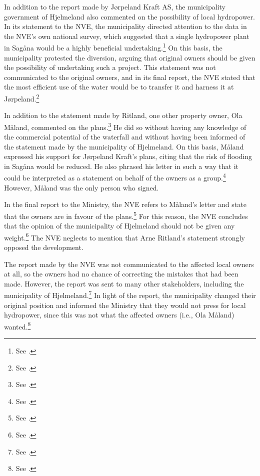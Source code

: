 In addition to the report made by Jørpeland Kraft AS, the municipality government of Hjelmeland also commented on the possibility of local hydropower. In its statement to the NVE, the municipality directed attention to the data in the NVE's own national survey, which suggested that a single hydropower plant in Sagåna would be a highly beneficial undertaking.\footnote{See \cite[19]{jorpeland09}.} On this basis, the municipality protested the diversion, arguing that original owners should be given the possibility of undertaking such a project. This statement was not communicated to the original owners, and in its final report, the NVE stated that the most efficient use of the water would be to transfer it and harness it at Jørpeland.\footnote{See \cite[19]{jorpeland09}.}

In addition to the statement made by Ritland, one other property owner, Ola Måland, commented on the plans.\footnote{See \cite[17]{jorpeland09}.} He did so without having any knowledge of the commercial potential of the waterfall and without having been informed of the statement made by the municipality of Hjelmeland. On this basis, Måland expressed his support for Jørpeland Kraft's plans, citing that the risk of flooding in Sagåna would be reduced. He also phrased his letter in such a way that it could be interpreted as a statement on behalf of the owners as a group.\footnote{See \cite[17]{jorpeland09}.} However, Måland was the only person who signed.

In the final report to the Ministry, the NVE refers to Måland's letter and state that the owners are in favour of the plans.\footnote{See \cite[19]{jorpeland09}.} For this reason, the NVE concludes that the opinion of the municipality of Hjelmeland should not be given any weight.\footnote{See \cite[19]{jorpeland09}.} The NVE neglects to mention that Arne Ritland's statement strongly opposed the development. %

The report made by the NVE was not communicated to the affected local owners at all, so the owners had no chance of correcting the mistakes that had been made. However, the report was sent to many other stakeholders, including the municipality of Hjelmeland.\footnote{See \cite[24]{jorpeland09}.} In light of the report, the municipality changed their original position and informed the Ministry that they would not press for local hydropower, since this was not what the affected owners (i.e., Ola Måland) wanted.\footnote{See \cite[24]{jorpeland09}.}

